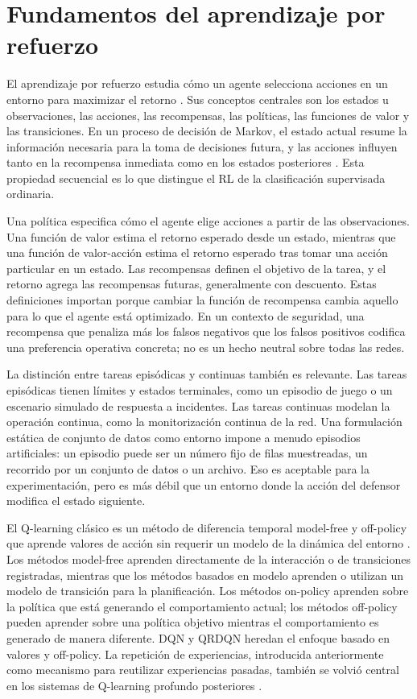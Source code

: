 \section{Fundamentos del aprendizaje por refuerzo}

El aprendizaje por refuerzo estudia cómo un agente selecciona acciones en un entorno para maximizar el retorno \parencite{SuttonBarto2018RL}. Sus conceptos centrales son los estados u observaciones, las acciones, las recompensas, las políticas, las funciones de valor y las transiciones. En un proceso de decisión de Markov, el estado actual resume la información necesaria para la toma de decisiones futura, y las acciones influyen tanto en la recompensa inmediata como en los estados posteriores \parencite{SuttonBarto2018RL}. Esta propiedad secuencial es lo que distingue el RL de la clasificación supervisada ordinaria.

Una política especifica cómo el agente elige acciones a partir de las observaciones. Una función de valor estima el retorno esperado desde un estado, mientras que una función de valor-acción estima el retorno esperado tras tomar una acción particular en un estado. Las recompensas definen el objetivo de la tarea, y el retorno agrega las recompensas futuras, generalmente con descuento. Estas definiciones importan porque cambiar la función de recompensa cambia aquello para lo que el agente está optimizado. En un contexto de seguridad, una recompensa que penaliza más los falsos negativos que los falsos positivos codifica una preferencia operativa concreta; no es un hecho neutral sobre todas las redes.

La distinción entre tareas episódicas y continuas también es relevante. Las tareas episódicas tienen límites y estados terminales, como un episodio de juego o un escenario simulado de respuesta a incidentes. Las tareas continuas modelan la operación continua, como la monitorización continua de la red. Una formulación estática de conjunto de datos como entorno impone a menudo episodios artificiales: un episodio puede ser un número fijo de filas muestreadas, un recorrido por un conjunto de datos o un archivo. Eso es aceptable para la experimentación, pero es más débil que un entorno donde la acción del defensor modifica el estado siguiente.

El Q-learning clásico es un método de diferencia temporal model-free y off-policy que aprende valores de acción sin requerir un modelo de la dinámica del entorno \parencite{WatkinsDayan1992QLearning}. Los métodos model-free aprenden directamente de la interacción o de transiciones registradas, mientras que los métodos basados en modelo aprenden o utilizan un modelo de transición para la planificación. Los métodos on-policy aprenden sobre la política que está generando el comportamiento actual; los métodos off-policy pueden aprender sobre una política objetivo mientras el comportamiento es generado de manera diferente. DQN y QRDQN heredan el enfoque basado en valores y off-policy. La repetición de experiencias, introducida anteriormente como mecanismo para reutilizar experiencias pasadas, también se volvió central en los sistemas de Q-learning profundo posteriores \parencite{Lin1992ReactiveAgents}.

